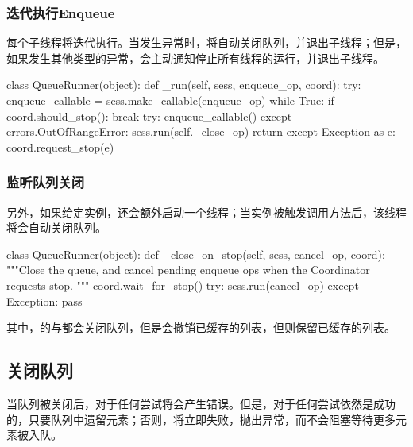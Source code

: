 \begin{content}
\subsubsection{迭代执行Enqueue}

每个子线程将迭代执行。当发生异常时，将自动关闭队列，并退出子线程；但是，如果发生其他类型的异常，会主动通知停止所有线程的运行，并退出子线程。

\begin{leftbar}
\begin{python}
class QueueRunner(object):
  def _run(self, sess, enqueue_op, coord):
    try:
      enqueue_callable = sess.make_callable(enqueue_op)
      while True:
        if coord.should_stop():
          break
        try:
          enqueue_callable()
        except errors.OutOfRangeError:  
          sess.run(self._close_op)
          return
    except Exception as e:
      coord.request_stop(e)
\end{python}
\end{leftbar}

\subsubsection{监听队列关闭}

另外，如果给定实例，还会额外启动一个线程；当实例被触发调用方法后，该线程将会自动关闭队列。

\begin{leftbar}
\begin{python}
class QueueRunner(object):
  def _close_on_stop(self, sess, cancel_op, coord):
    """Close the queue, and cancel pending enqueue ops
       when the Coordinator requests stop.
    """
    coord.wait_for_stop()
    try:
      sess.run(cancel_op)
    except Exception:
      pass
\end{python}
\end{leftbar}

其中，的与都会关闭队列，但是会撤销已缓存的列表，但则保留已缓存的列表。

\subsection{关闭队列}

当队列被关闭后，对于任何尝试将会产生错误。但是，对于任何尝试依然是成功的，只要队列中遗留元素；否则，将立即失败，抛出异常，而不会阻塞等待更多元素被入队。

\end{content}